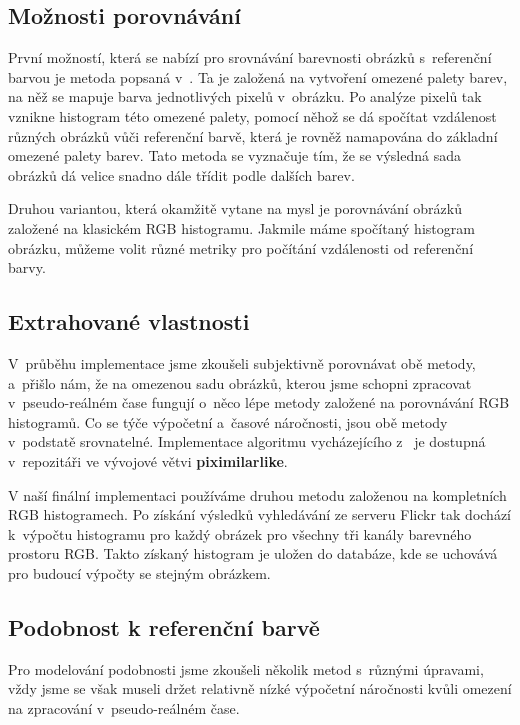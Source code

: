 \documentclass[12pt,oneside,a4paper]{article}
\begin{document}
\subsection{Možnosti porovnávání}
První možností, která se nabízí pro srovnávání barevnosti obrázků s~referenční barvou je metoda popsaná v~\cite{Mueller2k9}. Ta je založená na vytvoření omezené palety barev, na něž se mapuje barva jednotlivých pixelů v~obrázku. Po analýze pixelů tak vznikne histogram této omezené palety, pomocí něhož se dá spočítat vzdálenost různých obrázků vůči referenční barvě, která je rovněž namapována do základní omezené palety barev. Tato metoda se vyznačuje tím, že se výsledná sada obrázků dá velice snadno dále třídit podle dalších barev.

Druhou variantou, která okamžitě vytane na mysl je porovnávání obrázků založené na klasickém RGB histogramu. Jakmile máme spočítaný histogram obrázku, můžeme volit různé metriky pro počítání vzdálenosti od referenční barvy.

\subsection{Extrahované vlastnosti}

V~průběhu implementace jsme zkoušeli subjektivně porovnávat obě metody, a~přišlo nám, že na omezenou sadu obrázků, kterou jsme schopni zpracovat v~pseudo-reálném čase fungují o~něco lépe metody založené na porovnávání RGB histogramů. Co se týče výpočetní a~časové náročnosti, jsou obě metody v~podstatě srovnatelné. Implementace algoritmu vycházejícího z~\cite{Mueller2k9} je dostupná v~repozitáři \cite{official} ve vývojové větvi \textbf{piximilarlike}.

V naší finální implementaci používáme druhou metodu založenou na kompletních RGB histogramech. Po získání výsledků vyhledávání ze serveru Flickr tak dochází k~výpočtu histogramu pro každý obrázek pro všechny tři kanály barevného prostoru RGB. Takto získaný histogram je uložen do databáze, kde se uchovává pro budoucí výpočty se stejným obrázkem.

\subsection{Podobnost k referenční barvě}
\label{sec:podobnost}

Pro modelování podobnosti jsme zkoušeli několik metod s~různými úpravami, vždy jsme se však museli držet relativně nízké výpočetní náročnosti kvůli omezení na zpracování v~pseudo-reálném čase.
\end{document}
